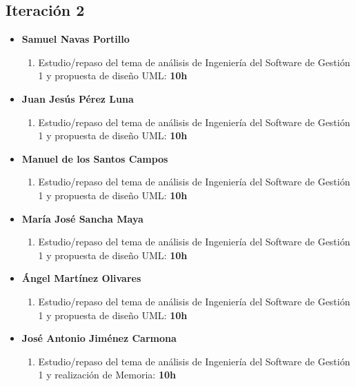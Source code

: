 \documentclass[11 pt]{book}
\begin{document}
		\subsection*{Iteración 2}
		    \begin{itemize}
			    \item \textbf {Samuel Navas Portillo}
				    \begin{enumerate}
					    \item Estudio/repaso del tema de análisis de Ingeniería del Software de Gestión 1 y propuesta de diseño UML: \textbf{10h}
				    \end{enumerate}
			    \item \textbf {Juan Jesús Pérez Luna}
				    \begin{enumerate}
					    \item Estudio/repaso del tema de análisis de Ingeniería del Software de Gestión 1 y propuesta de diseño UML: \textbf{10h}
				    \end{enumerate}
			    \item \textbf {Manuel de los Santos Campos}
				    \begin{enumerate}
					    \item Estudio/repaso del tema de análisis de Ingeniería del Software de Gestión 1 y propuesta de diseño UML: \textbf{10h}
				    \end{enumerate}
			    \item \textbf {María José Sancha Maya}
				    \begin{enumerate}
					    \item Estudio/repaso del tema de análisis de Ingeniería del Software de Gestión 1 y propuesta de diseño UML: \textbf{10h}
				    \end{enumerate}
			    \item \textbf {Ángel Martínez Olivares}
				    \begin{enumerate}
					    \item Estudio/repaso del tema de análisis de Ingeniería del Software de Gestión 1 y propuesta de diseño UML: \textbf{10h}
				    \end{enumerate}
			    \item \textbf {José Antonio Jiménez Carmona}
				    \begin{enumerate}
					    \item Estudio/repaso del tema de análisis de Ingeniería del Software de Gestión 1 y realización de Memoria: \textbf{10h}
				    \end{enumerate}
		    \end{itemize}
		
\end{document}
